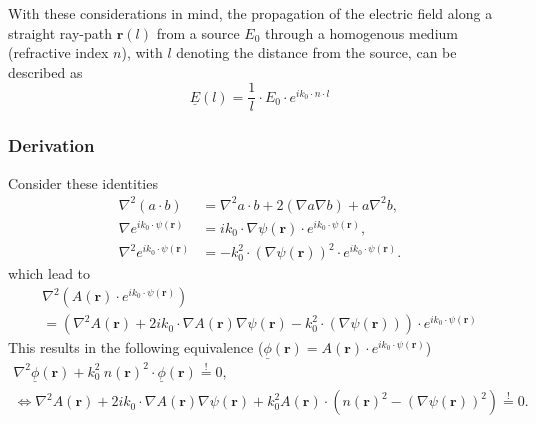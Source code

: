 With these considerations in mind, the propagation of the electric field along a straight ray-path \(\mathbf{r}(l)\) from a source \(E_0\) through a homogenous medium (refractive index \(n\)), with \(l\) denoting the distance from the source, can be described as
\begin{equation}
    \underline{E}(l) = \frac{1}{l} \cdot E_0 \cdot e^{i k_0 \cdot n \cdot l}
\end{equation}




\subsubsection{Derivation}\label{derivation}

Consider these identities
\begin{align}
    \nabla^2 (a \cdot b) &= \nabla^2 a \cdot b + 2 (\nabla a \nabla b) + a \nabla^2 b, \\
    \nabla e^{i k_0 \cdot \psi(\mathbf{r})} &= i k_0 \cdot \nabla \psi(\mathbf{r}) \cdot e^{i k_0 \cdot \psi(\mathbf{r})}, \\
    \nabla^2 e^{i k_0 \cdot \psi(\mathbf{r})} &= - k_0^2 \cdot {(\nabla \psi(\mathbf{r}))}^2 \cdot e^{i k_0 \cdot \psi(\mathbf{r})}.
\end{align}
which lead to
\begin{gather}
    \nabla^2 (A(\mathbf{r}) \cdot e^{ik_0 \cdot \psi(\mathbf{r})}) \\
    = (\nabla^2 A(\mathbf{r}) + 2ik_0 \cdot \nabla A(\mathbf{r}) \nabla \psi(\mathbf{r}) - k_0^2 \cdot (\nabla \psi(\mathbf{r}))) \cdot e^{ik_0 \cdot \psi(\mathbf{r})}
\end{gather}
This results in the following equivalence (\(\underline{\phi}(\mathbf{r}) = A(\mathbf{r}) \cdot e^{ik_0 \cdot \psi(\mathbf{r})}\))
\begin{gather}
    \nabla^2 \underline{\phi}(\mathbf{r}) + k_0^2\ n{(\mathbf{r})}^2 \cdot \underline{\phi}(\mathbf{r}) \stackrel{!}{=} 0, \\
    \Leftrightarrow \nabla^2 A(\mathbf{r}) + 2ik_0 \cdot \nabla A(\mathbf{r}) \nabla \psi(\mathbf{r}) + k_0^2 A(\mathbf{r}) \cdot ({n(\mathbf{r})}^2 - {(\nabla \psi(\mathbf{r}))}^2) \stackrel{!}{=} 0.
\end{gather}